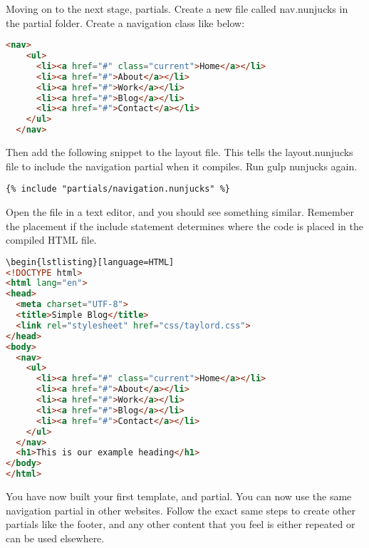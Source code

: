 Moving on to the next stage, partials. Create a new file called nav.nunjucks in the partial folder. Create a navigation class like below: 


\begin{lstlisting}[language=HTML]
  <nav>
    <ul>
      <li><a href="#" class="current">Home</a></li>
      <li><a href="#">About</a></li>
      <li><a href="#">Work</a></li>
      <li><a href="#">Blog</a></li>
      <li><a href="#">Contact</a></li>
    </ul>
  </nav>
\end{lstlisting}

Then add the following snippet to the layout file. This tells the layout.nunjucks file to include the navigation partial when it compiles. Run gulp nunjucks again.
\begin{lstlisting}[language=CSS3]
{% include "partials/navigation.nunjucks" %}
\end{lstlisting}

Open the file in a text editor, and you should see something similar. Remember the placement if the include statement determines where the code is placed in the compiled HTML file. 

\begin{lstlisting}[language=HTML]
\begin{lstlisting}[language=HTML]
<!DOCTYPE html>
<html lang="en">
<head>
  <meta charset="UTF-8">
  <title>Simple Blog</title>
  <link rel="stylesheet" href="css/taylord.css">
</head>
<body>
  <nav>
    <ul>
      <li><a href="#" class="current">Home</a></li>
      <li><a href="#">About</a></li>
      <li><a href="#">Work</a></li>
      <li><a href="#">Blog</a></li>
      <li><a href="#">Contact</a></li>
    </ul>
  </nav>
  <h1>This is our example heading</h1>
</body>
</html>
\end{lstlisting}

You have now built your first template, and partial. You can now  use the same navigation partial in other websites. Follow the exact same steps to create other partials like the footer, and any other content that you feel is either repeated or can be used elsewhere. 